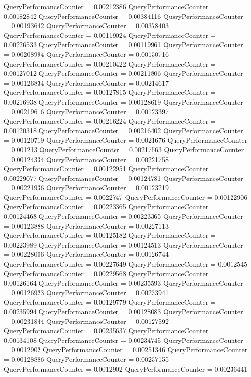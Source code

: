 \documentclass[9pt]{article}
\theoremstyle{plain}
\theoremstyle{definition}
\theoremstyle{remark}
\numberwithin{equation}{section}
\begin{document}
QueryPerformanceCounter  =  0.00212386
QueryPerformanceCounter  =  0.00182842
QueryPerformanceCounter  =  0.00384116
QueryPerformanceCounter  =  0.00193642
QueryPerformanceCounter  =  0.00378403
QueryPerformanceCounter  =  0.00119024
QueryPerformanceCounter  =  0.00226533
QueryPerformanceCounter  =  0.00119961
QueryPerformanceCounter  =  0.00208994
QueryPerformanceCounter  =  0.00130716
QueryPerformanceCounter  =  0.00210422
QueryPerformanceCounter  =  0.00127012
QueryPerformanceCounter  =  0.00211806
QueryPerformanceCounter  =  0.00126834
QueryPerformanceCounter  =  0.00214617
QueryPerformanceCounter  =  0.00127815
QueryPerformanceCounter  =  0.00216938
QueryPerformanceCounter  =  0.00128619
QueryPerformanceCounter  =  0.00219616
QueryPerformanceCounter  =  0.00123397
QueryPerformanceCounter  =  0.00216224
QueryPerformanceCounter  =  0.00120318
QueryPerformanceCounter  =  0.00216402
QueryPerformanceCounter  =  0.00120719
QueryPerformanceCounter  =  0.0021676
QueryPerformanceCounter  =  0.001213
QueryPerformanceCounter  =  0.00217563
QueryPerformanceCounter  =  0.00124334
QueryPerformanceCounter  =  0.00221758
QueryPerformanceCounter  =  0.00122951
QueryPerformanceCounter  =  0.00229077
QueryPerformanceCounter  =  0.00124781
QueryPerformanceCounter  =  0.00221936
QueryPerformanceCounter  =  0.00123219
QueryPerformanceCounter  =  0.0022747
QueryPerformanceCounter  =  0.00122906
QueryPerformanceCounter  =  0.00223365
QueryPerformanceCounter  =  0.00124468
QueryPerformanceCounter  =  0.00223365
QueryPerformanceCounter  =  0.00123888
QueryPerformanceCounter  =  0.00227113
QueryPerformanceCounter  =  0.00125182
QueryPerformanceCounter  =  0.00223989
QueryPerformanceCounter  =  0.00124513
QueryPerformanceCounter  =  0.00228006
QueryPerformanceCounter  =  0.00126744
QueryPerformanceCounter  =  0.00227649
QueryPerformanceCounter  =  0.0012545
QueryPerformanceCounter  =  0.00229568
QueryPerformanceCounter  =  0.00126164
QueryPerformanceCounter  =  0.00235593
QueryPerformanceCounter  =  0.00126923
QueryPerformanceCounter  =  0.00233941
QueryPerformanceCounter  =  0.00129779
QueryPerformanceCounter  =  0.00235994
QueryPerformanceCounter  =  0.00128083
QueryPerformanceCounter  =  0.00231844
QueryPerformanceCounter  =  0.00127592
QueryPerformanceCounter  =  0.00235637
QueryPerformanceCounter  =  0.00134108
QueryPerformanceCounter  =  0.00234745
QueryPerformanceCounter  =  0.0012902
QueryPerformanceCounter  =  0.00251346
QueryPerformanceCounter  =  0.00128886
QueryPerformanceCounter  =  0.00237155
QueryPerformanceCounter  =  0.0012902
QueryPerformanceCounter  =  0.00236441
\end{document}
